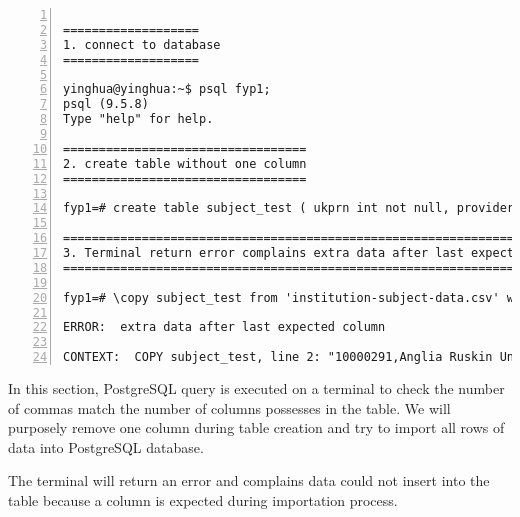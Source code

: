 \lstset{basicstyle=\ttfamily\tiny} 
\begin{lstlisting}[breaklines, frame=single, numbers=left, caption={Match number of commas with database columns}, label=commandline-02]

===================
1. connect to database
===================

yinghua@yinghua:~$ psql fyp1;
psql (9.5.8)
Type "help" for help.

==================================
2. create table without one column
==================================

fyp1=# create table subject_test ( ukprn int not null, providername varchar(100) not null, region varchar(100) not null, subject varchar(50) not null, sex varchar(30) not null, yearaftergraduation varchar(30) not null, grads varchar(10) null default null, unmatched varchar(20) null default null, matched varchar(20) null default null, activityNotCaptured varchar(20) default null, nosustdest varchar(20) null default null, sustemponly varchar(20) null default null, sustemp varchar(20) null default null, sustempfsorboth varchar(20) null default null, earningsinclude varchar(20) null default null, lowerannearn varchar(20) null default null, medianannearn varchar(20) null default null, upperannearn varchar(20) null default null, polargrpone varchar(20) null default null, polargrponeincluded varchar(20) null default null, prattband varchar(20) null default null);

========================================================================
3. Terminal return error complains extra data after last expected column
========================================================================

fyp1=# \copy subject_test from 'institution-subject-data.csv' with header csv;

ERROR:  extra data after last expected column

CONTEXT:  COPY subject_test, line 2: "10000291,Anglia Ruskin University,East,Agriculture & related subjects,Female,1,30,x,x,x,x,x,x,x,20,9..."

\end{lstlisting}

In this section, PostgreSQL query is executed on a terminal to check the number of commas match the number of columns possesses in the table. We will purposely remove one column during table creation and try to import all rows of data into PostgreSQL database. 

The terminal will return an error and complains data could not insert into the table because a column is expected during importation process. 
\linebreak

